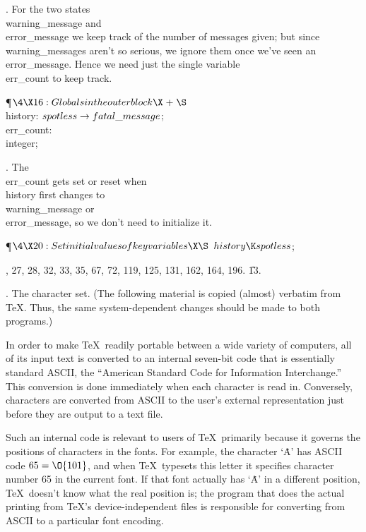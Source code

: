 .
For the two states \\{warning\_message} and \\{error\_message} we keep track
of the number of messages given; but since \\{warning\_message}s aren't
so serious, we ignore them once we've seen an \\{error\_message}.  Hence
we need just the single variable \\{err\_count} to keep track.


\Y\P$\4\X16:Globals in the outer block\X\mathrel{+}\S$\6
\4\\{history}: $\\{spotless}\to\\{fatal\_message}$;%
\6
\4\\{err\_count}: \\{integer};\par
\fi

.
The \\{err\_count} gets set or reset when \\{history} first changes to
\\{warning\_message} or \\{error\_message}, so we don't need to initialize
it.

\Y\P$\4\X20:Set initial values of key variables\X\S$\6
$\\{history}\K\\{spotless}$;\par
{}, 27, 28, 32, 33, 35, 67, 72, 119, 125, 131, 162, 164, 196.
\U13.\fi

.  The character set.
(The following material is copied (almost) verbatim from \TeX.
Thus, the same system-dependent changes should be made to both programs.)

In order to make \TeX\ readily portable between a wide variety of
computers, all of its input text is converted to an internal seven-bit
code that is essentially standard ASCII, the ``American Standard Code for
Information Interchange.''  This conversion is done immediately when each
character is read in. Conversely, characters are converted from ASCII to
the user's external representation just before they are output to a
text file.

Such an internal code is relevant to users of \TeX\ primarily because it
governs the positions of characters in the fonts. For example, the
character `\.A' has ASCII code $65=\O{101}$, and when \TeX\ typesets
this letter it specifies character number 65 in the current font.
If that font actually has `\.A' in a different position, \TeX\ doesn't
know what the real position is; the program that does the actual printing from
\TeX's device-independent files is responsible for converting from ASCII to
a particular font encoding.

